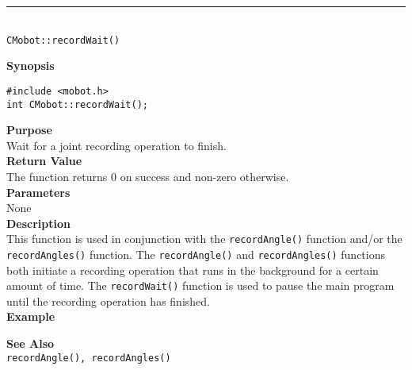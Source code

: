 \noindent
\vspace{5pt}
\rule{4.5in}{0.015in}\\
\noindent
{\LARGE \texttt{CMobot::recordWait()}}\\
{}

\noindent
{\bf Synopsis}
\vspace{-8pt}
\begin{verbatim}
#include <mobot.h>
int CMobot::recordWait();
\end{verbatim}

\noindent
{\bf Purpose}\\
Wait for a joint recording operation to finish.\\

\noindent
{\bf Return Value}\\
The function returns 0 on success and non-zero otherwise.\\

\noindent
{\bf Parameters}\\
None\\

\noindent
{\bf Description}\\
This function is used in conjunction with the \texttt{recordAngle()} function and/or
the \texttt{recordAngles()} function. The \texttt{recordAngle()} and \texttt{recordAngles()} 
functions both initiate a recording operation that runs in the background for a certain 
amount of time. The \texttt{recordWait()} function is used to pause the main program
until the recording operation has finished. \\

\noindent
{\bf Example}\\
\noindent

\noindent
{\bf See Also}\\
\texttt{recordAngle(), recordAngles()} \\
